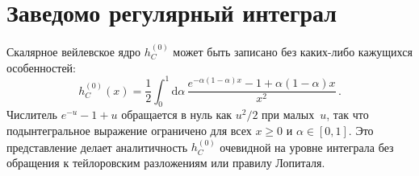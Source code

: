 \documentclass[aps,prd,twocolumn,superscriptaddress,nofootinbib,floatfix]{revtex4-2}
\theoremstyle{definition}
\theoremstyle{remark}
\newcommand{\dd}{\mathrm{d}}
\begin{document}
\section{Заведомо регулярный интеграл}
\label{app:regular}

Скалярное вейлевское ядро $h_C^{(0)}$ может быть записано без каких-либо
кажущихся особенностей:
\begin{equation}
  h_C^{(0)}(x) = \frac{1}{2}\int_0^1 \dd\alpha\,
    \frac{e^{-\alpha(1-\alpha)x} - 1 + \alpha(1-\alpha)x}{x^2}\,.
\end{equation}
Числитель $e^{-u} - 1 + u$ обращается в нуль как $u^2/2$ при малых~$u$,
так что подынтегральное выражение ограничено для всех $x \geq 0$ и
$\alpha \in [0,1]$. Это представление делает аналитичность $h_C^{(0)}$
очевидной на уровне интеграла без обращения к тейлоровским разложениям или
правилу Лопиталя.



\end{document}
